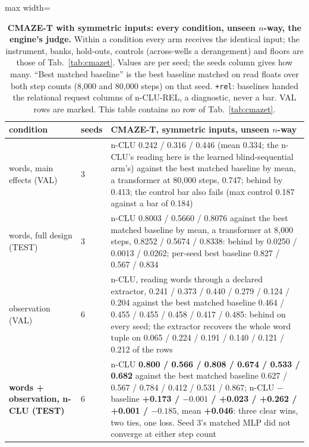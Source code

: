 \documentclass{article} %
\begin{document}
\begin{table}[h]
\centering\scriptsize
\caption{\textbf{CMAZE-T with symmetric inputs: every condition, unseen $n$-way, the engine's judge.} Within a %
condition every arm receives the identical input; the instrument, banks, hold-outs, controls
(across-wells a derangement) and floors are those of Tab.~\ref{tab:cmazet}. Values are per seed; the
seeds column gives how many. ``Best matched baseline'' is the best baseline matched on read floats over both
step counts (8,000 and 80,000 steps) on that seed. %
\texttt{+rel}: baselines handed the relational request columns of
n-CLU-REL, a diagnostic, never a bar. VAL rows are marked. This table contains no row of
Tab.~\ref{tab:cmazet}.}
\label{tab:cmazet-sym}
\setlength{\tabcolsep}{2pt}
\begin{adjustbox}{max width=\linewidth}\begin{tabular}{p{2.2cm}p{0.6cm}p{10.3cm}}
\toprule
condition & seeds & CMAZE-T, symmetric inputs, unseen $n$-way \\
\midrule
words, main effects (VAL) & 3 & n-CLU 0.242 / 0.316 / 0.446 (mean 0.334; the n-CLU's reading here is the learned blind-sequential arm's) against the best matched baseline by mean, a transformer at 80,000 steps, 0.747; behind by 0.413; the control bar also fails (max control 0.187 against a bar of 0.184) \\
words, full design (TEST) & 3 & n-CLU 0.8003 / 0.5660 / 0.8076 against the best matched baseline by mean, a transformer at 8,000 steps, 0.8252 / 0.5674 / 0.8338: behind by 0.0250 / 0.0013 / 0.0262; per-seed best baseline 0.827 / 0.567 / 0.834 \\
observation (VAL) & 6 & n-CLU, reading words through a declared extractor, 0.241 / 0.373 / 0.440 / 0.279 / 0.124 / 0.204 against the best matched baseline 0.464 / 0.455 / 0.455 / 0.458 / 0.417 / 0.485: behind on every seed; the extractor recovers the whole word tuple on 0.065 / 0.224 / 0.191 / 0.140 / 0.121 / 0.212 of the rows \\
\midrule
\textbf{words + observation, n-CLU (TEST)} & 6 & n-CLU \textbf{0.800 / 0.566 / 0.808 / 0.674 / 0.533 / 0.682} against the best matched baseline 0.627 / 0.567 / 0.784 / 0.412 / 0.531 / 0.867; n-CLU $-$ baseline \textbf{+0.173 / $-0.001$ / +0.023 / +0.262 / +0.001 / $-0.185$}, mean \textbf{+0.046}: three clear wins, two ties, one loss. Seed 3's matched MLP did not converge at either step count \\

\end{tabular}
\end{adjustbox}
\end{table}
\end{document}
